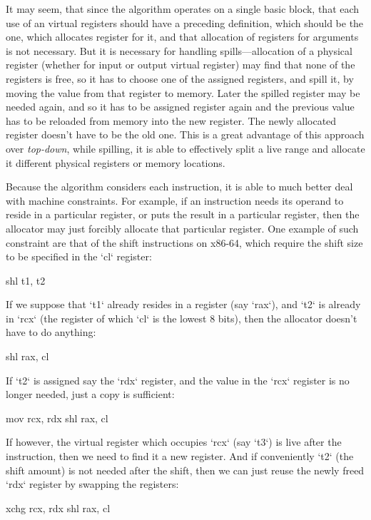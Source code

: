 It may seem, that since the algorithm operates on a single basic block, that each
use of an virtual registers should have a preceding definition, which should be
the one, which allocates register for it, and that allocation of registers for
arguments is not necessary. But it is necessary for handling spills---allocation
of a physical register (whether for input or output virtual register) may find
that none of the registers is free, so it has to choose one of the assigned
registers, and spill it, by moving the value from that register to memory. Later
the spilled register may be needed again, and so it has to be assigned register
again and the previous value has to be reloaded from memory into the new
register. The newly allocated register doesn't have to be the old one. This is a
great advantage of this approach over {\em top-down}, while spilling, it is able
to effectively split a live range and allocate it different physical registers
or memory locations.

Because the algorithm considers each instruction, it is able to much better deal
with machine constraints. For example, if an instruction needs its operand to
reside in a particular register, or puts the result in a particular register,
then the allocator may just forcibly allocate that particular register. One
example of such constraint are that of the shift instructions on x86-64, which
require the shift size to be specified in the `cl` register:

\begtt
shl t1, t2 %
\endtt

If we suppose that `t1` already resides in a register (say `rax`), and `t2` is
already in `rcx` (the register of which `cl` is the lowest 8 bits), then the
allocator doesn't have to do anything:

\begtt
shl rax, cl %
\endtt

If `t2` is assigned say the `rdx` register, and the value in the `rcx` register
is no longer needed, just a copy is sufficient:

\begtt
mov rcx, rdx
shl rax, cl
\endtt

If however, the virtual register which occupies `rcx` (say `t3`) is live after
the instruction, then we need to find it a new register. And if conveniently
`t2` (the shift amount) is not needed after the shift, then we can just reuse
the newly freed `rdx` register by swapping the registers:

\begtt
xchg rcx, rdx
shl rax, cl
\endtt

